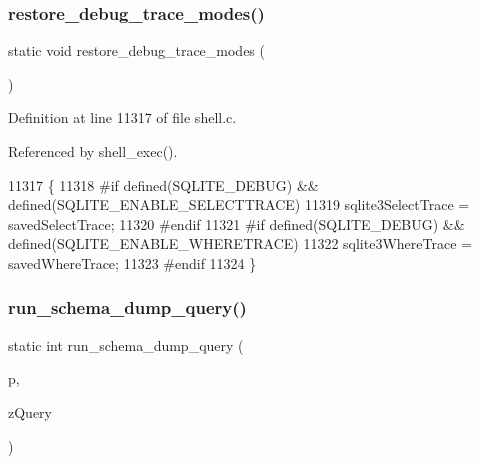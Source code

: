 \mbox{\label{shell_8c_a716d20d1a034ab08a67f7b53fc812453}} 
\subsubsection{restore\+\_\+debug\+\_\+trace\+\_\+modes()}
{\footnotesize\ttfamily static void restore\+\_\+debug\+\_\+trace\+\_\+modes (\begin{DoxyParamCaption}\item[{void}]{ }\end{DoxyParamCaption})\hspace{0.3cm}{\ttfamily [static]}}



Definition at line 11317 of file shell.\+c.



Referenced by shell\+\_\+exec().


\begin{DoxyCode}
11317                                            \{
11318 \textcolor{preprocessor}{#if defined(SQLITE\_DEBUG) && defined(SQLITE\_ENABLE\_SELECTTRACE)}
11319   sqlite3SelectTrace = savedSelectTrace;
11320 \textcolor{preprocessor}{#endif}
11321 \textcolor{preprocessor}{#if defined(SQLITE\_DEBUG) && defined(SQLITE\_ENABLE\_WHERETRACE)}
11322   sqlite3WhereTrace = savedWhereTrace;
11323 \textcolor{preprocessor}{#endif}
11324 \}
\end{DoxyCode}
\mbox{\label{shell_8c_ad779d0d1b64b032187a57c9106ca82fb}} 
\subsubsection{run\+\_\+schema\+\_\+dump\+\_\+query()}
{\footnotesize\ttfamily static int run\+\_\+schema\+\_\+dump\+\_\+query (\begin{DoxyParamCaption}\item[{\textbf{ Shell\+State} $\ast$}]{p,  }\item[{const char $\ast$}]{z\+Query }\end{DoxyParamCaption})\hspace{0.3cm}{\ttfamily [static]}}



